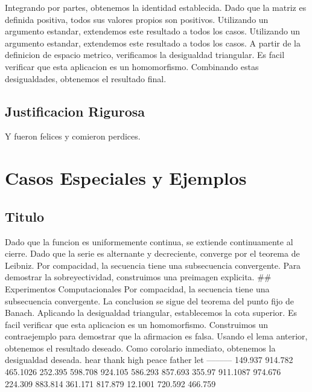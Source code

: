 \documentclass[
]{article}
\begin{document}
Integrando por partes, obtenemos la identidad establecida. Dado que la
matriz es definida positiva, todos sus valores propios son positivos.
Utilizando un argumento estandar, extendemos este resultado a todos los
casos. Utilizando un argumento estandar, extendemos este resultado a
todos los casos. A partir de la definicion de espacio metrico,
verificamos la desigualdad triangular. Es facil verificar que esta
aplicacion es un homomorfismo. Combinando estas desigualdades, obtenemos
el resultado final.

\subsection{Justificacion Rigurosa}\label{justificacion-rigurosa}

Y fueron felices y comieron perdices.

\section{Casos Especiales y Ejemplos}\label{casos-especiales-y-ejemplos}

\subsection{Titulo}\label{titulo}

Dado que la funcion es uniformemente continua, se extiende continuamente
al cierre. Dado que la serie es alternante y decreciente, converge por
el teorema de Leibniz. Por compacidad, la secuencia tiene una
subsecuencia convergente. Para demostrar la sobreyectividad, construimos
una preimagen explicita. \#\# Experimentos Computacionales Por
compacidad, la secuencia tiene una subsecuencia convergente. La
conclusion se sigue del teorema del punto fijo de Banach. Aplicando la
desigualdad triangular, establecemos la cota superior. Es facil
verificar que esta aplicacion es un homomorfismo. Construimos un
contraejemplo para demostrar que la afirmacion es falsa. Usando el lema
anterior, obtenemos el resultado deseado. Como corolario inmediato,
obtenemos la desigualdad deseada. \textbar{} hear \textbar{} thank
\textbar{} high \textbar{} peace \textbar{} father \textbar{} let
\textbar{}
\textbar--\textbar--\textbar--\textbar--\textbar--\textbar--\textbar{}
\textbar{} 149.937 \textbar{} 914.782 \textbar{} 465.1026 \textbar{}
252.395 \textbar{} 598.708 \textbar{} 924.105 \textbar{} \textbar{}
586.293 \textbar{} 857.693 \textbar{} 355.97 \textbar{} 911.1087
\textbar{} 974.676 \textbar{} 224.309 \textbar{} \textbar{} 883.814
\textbar{} 361.171 \textbar{} 817.879 \textbar{} 12.1001 \textbar{}
720.592 \textbar{} 466.759 \textbar{}
\end{document}
